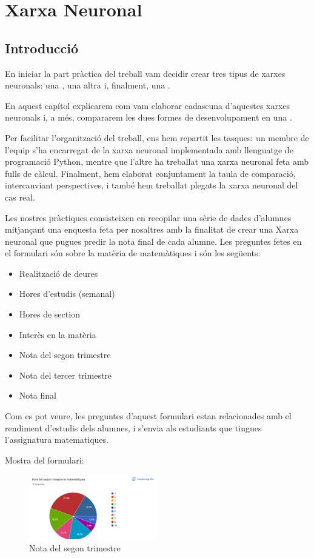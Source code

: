 \chapter{Xarxa Neuronal}
\section{Introducció}\label{sec:intr}
En iniciar la part pràctica del treball vam decidir crear tres tipus de xarxes neuronals: una , una altra  i, finalment, una .

En aquest capítol explicarem com vam elaborar cadascuna d’aquestes xarxes neuronals i, a més, compararem les dues formes de desenvolupament en una .

Per facilitar l’organització del treball, ens hem repartit les tasques: un membre de l’equip s’ha encarregat de la xarxa neuronal implementada amb llenguatge de programació Python, mentre que l’altre ha treballat una xarxa neuronal feta amb fulls de càlcul. Finalment, hem elaborat conjuntament la taula de comparació, intercanviant perspectives, i també hem treballat plegats la xarxa neuronal del cas real.

Les nostres pràctiques consisteixen en recopilar una sèrie de dades d'alumnes mitjançant una enquesta feta per nosaltres amb la finalitat de crear una Xarxa neuronal que pugues predir la nota final de cada alumne. Les preguntes fetes en el formulari són sobre la matèria de matemàtiques i són les següents:
\begin{itemize}
 \item Realització de deures
 \item Hores d'estudis (semanal)
 \item Hores de section
 \item Interès en la matèria
 \item Nota del segon trimestre
 \item Nota del tercer trimestre
 \item Nota final
\end{itemize}
Com es pot veure, les preguntes d'aquest formulari estan relacionades amb el rendiment d'estudis dels alumnes, i s'envia als estudiants que tingues l'assignatura matematiques.

Mostra del formulari:
\begin{figure}[H]
    \centering
    \includegraphics[width=0.5\textwidth]{./figures/14.png}
    \caption{Nota del segon trimestre}
\end{figure}

